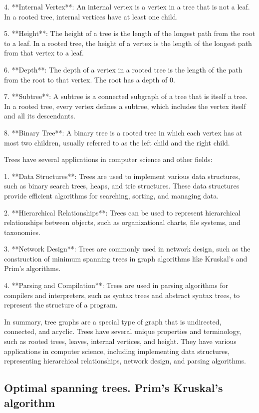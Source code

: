 \documentclass{article}
\begin{document}
4. **Internal Vertex**: An internal vertex is a vertex in a tree that is not a leaf. In a rooted tree, internal vertices have at least one child.

5. **Height**: The height of a tree is the length of the longest path from the root to a leaf. In a rooted tree, the height of a vertex is the length of the longest path from that vertex to a leaf.

6. **Depth**: The depth of a vertex in a rooted tree is the length of the path from the root to that vertex. The root has a depth of 0.

7. **Subtree**: A subtree is a connected subgraph of a tree that is itself a tree. In a rooted tree, every vertex defines a subtree, which includes the vertex itself and all its descendants.

8. **Binary Tree**: A binary tree is a rooted tree in which each vertex has at most two children, usually referred to as the left child and the right child.

Trees have several applications in computer science and other fields:

1. **Data Structures**: Trees are used to implement various data structures, such as binary search trees, heaps, and trie structures. These data structures provide efficient algorithms for searching, sorting, and managing data.

2. **Hierarchical Relationships**: Trees can be used to represent hierarchical relationships between objects, such as organizational charts, file systems, and taxonomies.

3. **Network Design**: Trees are commonly used in network design, such as the construction of minimum spanning trees in graph algorithms like Kruskal's and Prim's algorithms.

4. **Parsing and Compilation**: Trees are used in parsing algorithms for compilers and interpreters, such as syntax trees and abstract syntax trees, to represent the structure of a program.

In summary, tree graphs are a special type of graph that is undirected, connected, and acyclic. Trees have several unique properties and terminology, such as rooted trees, leaves, internal vertices, and height. They have various applications in computer science, including implementing data structures, representing hierarchical relationships, network design, and parsing algorithms.


\subsection{Optimal spanning trees. Prim’s Kruskal’s algorithm}
\end{document}
